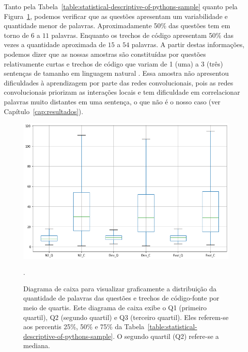 Tanto pela Tabela~\ref{table:statistical-descriptive-of-pythons-sample} quanto pela Figura~\ref{fig:boxplot-number-of-words}, podemos verificar que as questões apresentam um variabilidade e quantidade menor de palavras. Aproximadamente 50\% das questões tem em torno de $6$ a $11$ palavras. Enquanto os trechos de código apresentam 50\% das vezes a quantidade aproximada de $15$ a $54$ palavras. A partir destas informações, podemos dizer que as nossas amostras são constituídas por questões relativamente curtas e trechos de código que variam de 1 (uma) a 3 (três) sentenças de tamanho em linguagem natural \citep{casi-newell-sentence-length-2018}. Essa amostra não apresentou dificuldades à aprendizagem por parte das redes convolucionais, pois as redes convolucionais priorizam as interações locais e tem dificuldade em correlacionar palavras muito distantes em uma sentença, o que não é o nosso caso (ver Capítulo~\ref{cap:resultados}).



\begin{figure}[h]
\centering
\includegraphics[width=1\textwidth]{figuras/cap-experimento/boxplot_number_of_words.png}
\caption[Diagrama de caixa para visualizar graficamente a distribuição da quantidade de palavras das questões e trechos de código-fonte por meio de quartis.]{Diagrama de caixa para visualizar graficamente a distribuição da quantidade de palavras das questões e trechos de código-fonte por meio de quartis. Este diagrama de caixa exibe o Q1 (primeiro quartil), Q2 (segundo quartil) e Q3 (terceiro quartil). Eles referem-se aos percentis 25\%, 50\% e 75\% da Tabela~\ref{table:statistical-descriptive-of-pythons-sample}. O segundo quartil (Q2) refere-se a mediana. }. 
\label{fig:boxplot-number-of-words}
\end{figure}

